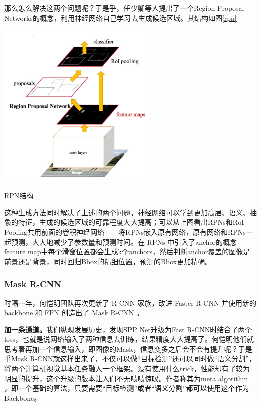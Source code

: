 那么怎么解决这两个问题呢？于是乎，任少卿等人提出了一个Region Proposal Networks的概念，利用神经网络自己学习去生成候选区域。其结构如图\ref{rpn}
\begin{uscfigure}
	\includegraphics[width=\textwidth,height=8cm]{./Pictures/faster_rcnn.jpg}	
	\caption{RPN结构}	
	\label{rpn}
\end{uscfigure}
这种生成方法同时解决了上述的两个问题，神经网络可以学到更加高层、语义、抽象的特征，生成的候选区域的可靠程度大大提高；可以从上图看出RPNs和RoI Pooling共用前面的卷积神经网络——将RPNs嵌入原有网络，原有网络和RPNs一起预测，大大地减少了参数量和预测时间。在 RPNs 中引入了anchor的概念feature map中每个滑窗位置都会生成k个anchors，然后判断anchor覆盖的图像是前景还是背景，同时回归Bbox的精细位置，预测的Bbox更加精确。
\subsubsection{Mask R-CNN}
时隔一年，何恺明团队再次更新了 R-CNN 家族，改进 Faster R-CNN 并使用新的 backbone 和 FPN 创造出了 Mask R-CNN 。

\textbf{加一条通道。}我们纵观发展历史，发现SPP Net升级为Fast R-CNN时结合了两个loss，也就是说网络输入了两种信息去训练，结果精度大大提高了。何恺明他们就思考着再加一个信息输入，即图像的Mask，信息变多之后会不会有提升呢？于是乎Mask R-CNN就这样出来了，不仅可以做“目标检测”还可以同时做“语义分割”，将两个计算机视觉基本任务融入一个框架。没有使用什么trick，性能却有了较为明显的提升，这个升级的版本让人们不无啧啧惊叹。作者称其为meta algorithm ，即一个基础的算法，只要需要“目标检测”或者“语义分割”都可以使用这个作为Backbone。


